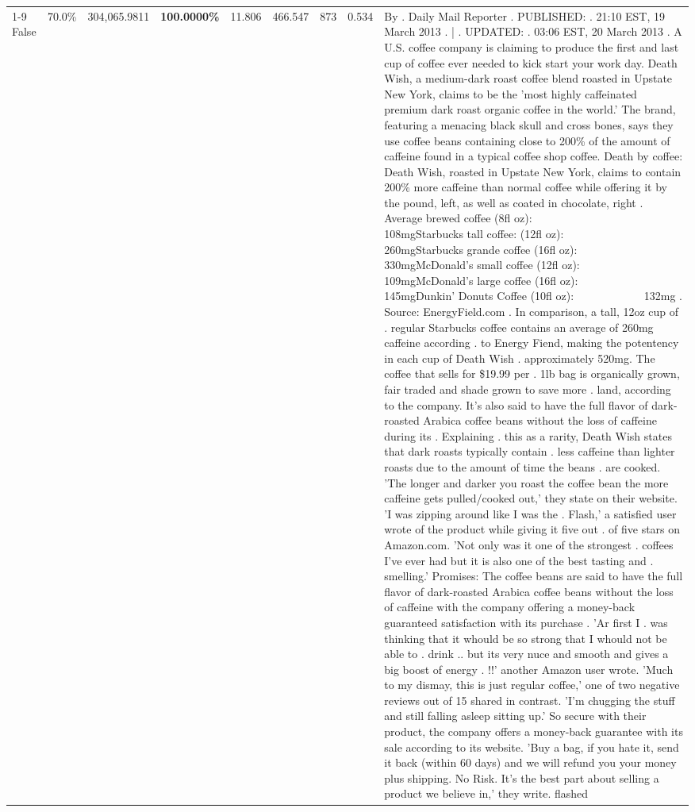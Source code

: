 \begin{table}[H]
{\begin{tabular}{lllrlllll}
\cline{1-9}
False & 70.0\% & 304,065.9811 & \bfseries \color{red} 100.0000\% & 11.806 & 466.547 & 873 & 0.534 & By . Daily Mail Reporter . PUBLISHED: . 21:10 EST, 19 March 2013 . | . UPDATED: . 03:06 EST, 20 March 2013 . A U.S. coffee company is claiming to produce the first and last cup of coffee ever needed to kick start your work day. Death Wish, a medium-dark roast coffee blend roasted in Upstate New York, claims to be the 'most highly caffeinated premium dark roast organic coffee in the world.' The brand, featuring a menacing black skull and cross bones, says they use coffee beans containing close to 200\% of the amount of caffeine found in a typical coffee shop coffee. Death by coffee: Death Wish, roasted in Upstate New York, claims to contain 200\% more caffeine than normal coffee while offering it by the pound, left, as well as coated in chocolate, right . Average brewed coffee (8fl oz):              108mgStarbucks tall coffee: (12fl oz):                260mgStarbucks grande coffee (16fl oz):         330mgMcDonald's small coffee (12fl oz):           109mgMcDonald's large coffee (16fl oz):           145mgDunkin' Donuts Coffee (10fl oz):             132mg . Source: EnergyField.com . In comparison, a tall, 12oz cup of . regular Starbucks coffee contains an average of 260mg caffeine according . to Energy Fiend, making the potentency in each cup of Death Wish . approximately 520mg. The coffee that sells for \$19.99 per . 1lb bag is organically grown, fair traded and shade grown to save more . land, according to the company. It's also said to have the full flavor of dark-roasted Arabica coffee beans without the loss of caffeine during its . Explaining . this as a rarity, Death Wish states that dark roasts typically contain . less caffeine than lighter roasts due to the amount of time the beans . are cooked. 'The longer and darker you roast the coffee bean the more caffeine gets pulled/cooked out,' they state on their website. 'I was zipping around like I was the . Flash,' a satisfied user wrote of the product while giving it five out . of five stars on Amazon.com. 'Not only was it one of the strongest . coffees I've ever had but it is also one of the best tasting and . smelling.’ Promises: The coffee beans are said to have the full flavor of dark-roasted Arabica coffee beans without the loss of caffeine with the company offering a money-back guaranteed satisfaction with its purchase . 'Ar first I . was thinking that it whould be so strong that I whould not be able to . drink .. but its very nuce and smooth and gives a big boost of energy . !!' another Amazon user wrote. 'Much to my dismay, this is just regular coffee,' one of two negative reviews out of 15 shared in contrast. 'I'm chugging the stuff and still falling asleep sitting up.' So secure with their product, the company offers a money-back guarantee with its sale according to its website. 'Buy a bag, if you hate it, send it back (within 60 days) and we will refund you your money plus shipping. No Risk. It’s the best part about selling a product we believe in,' they write. flashed \\

\end{tabular}}
\end{table}
